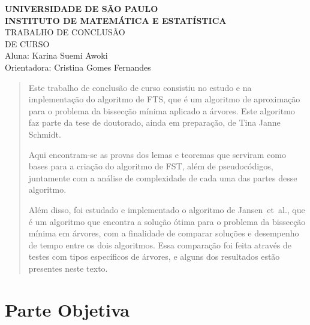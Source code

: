 \documentclass[a4paper,12pt]{article}
\begin{document}
 
\begin{center}
   {\large \textbf{UNIVERSIDADE DE SÃO PAULO}} \\[1.4cm]
   
   {\large \textbf{INSTITUTO DE MATEMÁTICA E ESTATÍSTICA}}\\[4.2cm]
   
   {\Huge TRABALHO DE CONCLUSÃO }\\[0.3cm]
   {\Huge DE CURSO }\\[9cm]
   
   {\large { Aluna: Karina Suemi Awoki}}\\[0.3cm]
   
   {\large { Orientadora: Cristina Gomes Fernandes}}
   

\end{center}

\newpage


\begin{abstract}
	Este trabalho de conclusão de curso 
	consistiu no estudo e na implementação
	do algoritmo de FTS, que 
	é um algoritmo de aproximação para
	o problema da bissecção mínima aplicado
	a árvores.
	Este algoritmo 
	faz parte da tese
	de doutorado, ainda em preparação, de 
	Tina Janne Schmidt.

	Aqui encontram-se as provas dos lemas e teoremas que 
	serviram como bases para a criação do
	algoritmo de FST, 
	além de pseudocódigos, juntamente com a
	análise de complexidade de cada uma das 
	partes desse algoritmo.

	Além disso, foi estudado e implementado
	o algoritmo de Jansen~et~al., que
	é um algoritmo que encontra a solução ótima
	para o problema da bissecção mínima em árvores, 
	com a 
	finalidade de comparar soluções e 
	desempenho de tempo entre os dois algoritmos.
	Essa comparação foi feita através de testes 
	com tipos específicos de árvores, e alguns dos
	resultados estão presentes neste texto.


\end{abstract}

\newpage

\tableofcontents

\newpage

\part{Parte Objetiva}
\end{document}
